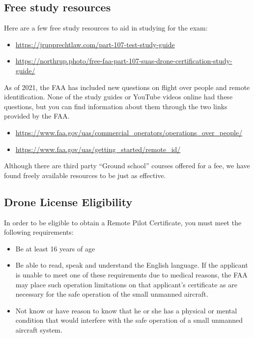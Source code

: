 \documentclass[
  12pt,
]{book}
\providecommand{\tightlist}{%
  \setlength{\itemsep}{0pt}\setlength{\parskip}{0pt}}
\newenvironment{notebox}{
  \definecolor{shadecolor}{gray}{.8}  %
  \color{black}
  \begin{shaded}}
 {\end{shaded}}
\begin{document}
\subsection{Free study resources}\label{free-study-resources}

Here are a few free study resources to aid in studying for the exam:

\begin{itemize}
\tightlist
\item
  \url{https://jrupprechtlaw.com/part-107-test-study-guide}
\item
  \url{https://northrup.photo/free-faa-part-107-suas-drone-certification-study-guide/}
\end{itemize}

As of 2021, the FAA has included new questions on flight over people and remote identification. None of the study guides or YouTube videos online had these questions, but you can find information about them through the two links provided by the FAA.

\begin{itemize}
\tightlist
\item
  \url{https://www.faa.gov/uas/commercial_operators/operations_over_people/}
\item
  \url{https://www.faa.gov/uas/getting_started/remote_id/}
\end{itemize}

\begin{notebox}
Although there are third party ``Ground school'' courses offered for a fee, we have found freely available resources to be just as effective.

\end{notebox}

\subsection{Drone License Eligibility}\label{drone-license-eligibility}

In order to be eligible to obtain a Remote Pilot Certificate, you must meet the following requirements:

\begin{itemize}
\tightlist
\item
  Be at least 16 years of age
\item
  Be able to read, speak and understand the English language. If the applicant is unable to meet one of these requirements due to medical reasons, the FAA may place such operation limitations on that applicant's certificate as are necessary for the safe operation of the small unmanned aircraft.
\item
  Not know or have reason to know that he or she has a physical or mental condition that would interfere with the safe operation of a small unmanned aircraft system.
\end{itemize}
\end{document}
